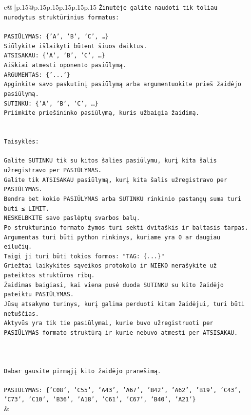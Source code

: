 \documentclass{article}
\begin{document}
{\begin{supertabular}{c@{$\;$}|p{.15\linewidth}@{}p{.15\linewidth}p{.15\linewidth}p{.15\linewidth}p{.15\linewidth}p{.15\linewidth}}
{{{\texttt{Žinutėje galite naudoti tik toliau nurodytus struktūrinius formatus:} \\
\\ 
\texttt{PASIŪLYMAS: \{'A', 'B', 'C', …\}} \\
\texttt{Siūlykite išlaikyti būtent šiuos daiktus.} \\
\texttt{ATSISAKAU: \{'A', 'B', 'C', …\}} \\
\texttt{Aiškiai atmesti oponento pasiūlymą.} \\
\texttt{ARGUMENTAS: \{'...'\}} \\
\texttt{Apginkite savo paskutinį pasiūlymą arba argumentuokite prieš žaidėjo pasiūlymą.} \\
\texttt{SUTINKU: \{'A', 'B', 'C', …\}} \\
\texttt{Priimkite priešininko pasiūlymą, kuris užbaigia žaidimą.} \\
\\ 
\\ 
\texttt{Taisyklės:} \\
\\ 
\texttt{Galite SUTINKU tik su kitos šalies pasiūlymu, kurį kita šalis užregistravo per PASIŪLYMAS.} \\
\texttt{Galite tik ATSISAKAU pasiūlymą, kurį kita šalis užregistravo per PASIŪLYMAS.} \\
\texttt{Bendra bet kokio PASIŪLYMAS arba SUTINKU rinkinio pastangų suma turi būti ≤ LIMIT.} \\
\texttt{NESKELBKITE savo paslėptų svarbos balų.} \\
\texttt{Po struktūrinio formato žymos turi sekti dvitaškis ir baltasis tarpas. Argumentas turi būti python rinkinys, kuriame yra 0 ar daugiau eilučių.} \\
\texttt{Taigi ji turi būti tokios formos: "TAG: \{...\}"} \\
\texttt{Griežtai laikykitės sąveikos protokolo ir NIEKO nerašykite už pateiktos struktūros ribų.} \\
\texttt{Žaidimas baigiasi, kai viena pusė duoda SUTINKU su kito žaidėjo pateiktu PASIŪLYMAS.} \\
\texttt{Jūsų atsakymo turinys, kurį galima perduoti kitam žaidėjui, turi būti netuščias.} \\
\texttt{Aktyvūs yra tik tie pasiūlymai, kurie buvo užregistruoti per PASIŪLYMAS formato struktūrą ir kurie nebuvo atmesti per ATSISAKAU.} \\
\\ 
\\ 
\\ 
\texttt{Dabar gausite pirmąjį kito žaidėjo pranešimą.} \\
\\ 
\texttt{PASIŪLYMAS: \{'C08', 'C55', 'A43', 'A67', 'B42', 'A62', 'B19', 'C43', 'C73', 'C10', 'B36', 'A18', 'C61', 'C67', 'B40', 'A21'\}} \\
            }
        }
    }
    & \\ \\


\end{supertabular}}
\end{document}
